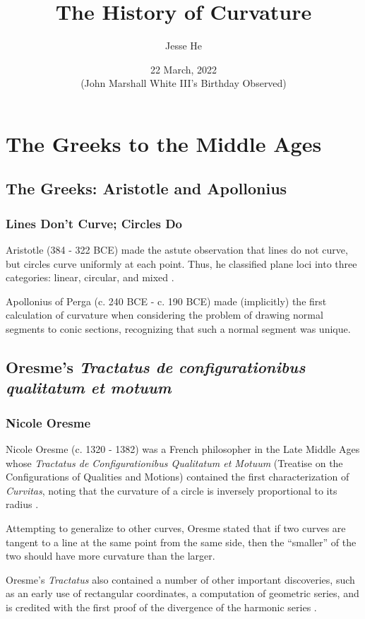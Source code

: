 \documentclass[handout]{beamer}
\title{The History of Curvature}
\author{Jesse He}
\institute{OSU Reading Classics}
\date{22 March, 2022\\(John Marshall White III's Birthday Observed)}
\theoremstyle{definition}
\begin{document}
    
\frame{\titlepage}

\section{The Greeks to the Middle Ages}

\subsection{The Greeks: Aristotle and Apollonius}

\begin{frame}
    \frametitle{Lines Don't Curve; Circles Do}

    \pause
    Aristotle (384 - 322 BCE) made the astute observation that lines do not curve,
    but circles curve uniformly at each point. Thus, he classified
    plane loci into three categories: linear, circular, and mixed \cite{unsat-hist}.

    \pause
    Apollonius of Perga (c. 240 BCE - c. 190 BCE) made (implicitly) the first
    calculation of curvature when considering the problem of drawing normal
    segments to conic sections, recognizing that such a normal segment was unique.

\end{frame}

\subsection{Oresme's \textit{Tractatus de configurationibus qualitatum et motuum}}

\begin{frame}
    \frametitle{Nicole Oresme}

    \pause
    Nicole Oresme (c. 1320 - 1382) was a French philosopher in the Late Middle Ages
    whose \textit{Tractatus de Configurationibus Qualitatum et Motuum} (Treatise
    on the Configurations of Qualities and Motions) contained the first characterization
    of \emph{Curvitas}, noting that the curvature of a circle is inversely proportional
    to its radius \cite{unsat-hist}.

    \pause
    Attempting to generalize to other curves, Oresme stated that if two curves are tangent
    to a line at the same point from the same side, then the ``smaller'' of the two should
    have more curvature than the larger.

    \pause
    Oresme's \emph{Tractatus} also contained a number of other important discoveries,
    such as an early use of rectangular coordinates, a computation of geometric series,
    and is credited with the first proof of the divergence of the harmonic
    series \cite{sep-nicole-oresme}.
\end{frame}
\end{document}

